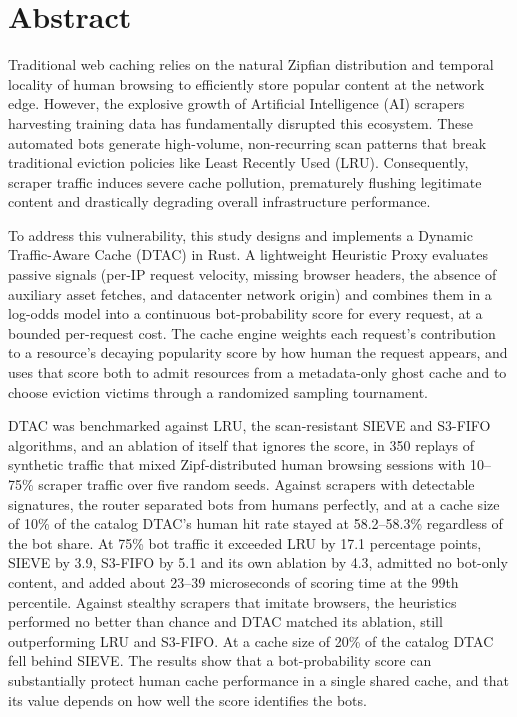 \documentclass[12pt,a4paper]{report}
\begin{document}
\tableofcontents
\newpage

\listoftables
\newpage
\listoffigures
\newpage

\chapter*{Abstract}

Traditional web caching relies on the natural Zipfian distribution and temporal locality of human browsing to efficiently store popular content at the network edge. However, the explosive growth of Artificial Intelligence (AI) scrapers harvesting training data has fundamentally disrupted this ecosystem. These automated bots generate high-volume, non-recurring scan patterns that break traditional eviction policies like Least Recently Used (LRU). Consequently, scraper traffic induces severe cache pollution, prematurely flushing legitimate content and drastically degrading overall infrastructure performance.

To address this vulnerability, this study designs and implements a Dynamic Traffic-Aware Cache (DTAC) in Rust. A lightweight Heuristic Proxy evaluates passive signals (per-IP request velocity, missing browser headers, the absence of auxiliary asset fetches, and datacenter network origin) and combines them in a log-odds model into a continuous bot-probability score for every request, at a bounded per-request cost. The cache engine weights each request's contribution to a resource's decaying popularity score by how human the request appears, and uses that score both to admit resources from a metadata-only ghost cache and to choose eviction victims through a randomized sampling tournament.

DTAC was benchmarked against LRU, the scan-resistant SIEVE and S3-FIFO algorithms, and an ablation of itself that ignores the score, in 350 replays of synthetic traffic that mixed Zipf-distributed human browsing sessions with 10--75\% scraper traffic over five random seeds. Against scrapers with detectable signatures, the router separated bots from humans perfectly, and at a cache size of 10\% of the catalog DTAC's human hit rate stayed at 58.2--58.3\% regardless of the bot share. At 75\% bot traffic it exceeded LRU by 17.1 percentage points, SIEVE by 3.9, S3-FIFO by 5.1 and its own ablation by 4.3, admitted no bot-only content, and added about 23--39 microseconds of scoring time at the 99th percentile. Against stealthy scrapers that imitate browsers, the heuristics performed no better than chance and DTAC matched its ablation, still outperforming LRU and S3-FIFO. At a cache size of 20\% of the catalog DTAC fell behind SIEVE. The results show that a bot-probability score can substantially protect human cache performance in a single shared cache, and that its value depends on how well the score identifies the bots.
\end{document}
